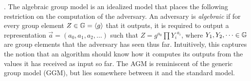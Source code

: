 . The algebraic group model is an idealized model that places the following restriction on the computation of the adversary. An adversary is \emph{algebraic} if for every group element $Z \in \mathbb{G} = \langle g \rangle$ that it outputs, it is required to output a representation $\vec{a} = (a_0, a_1, a_2, \dots)$ such that $Z = g^{a_0} \prod {Y_i}^{a_i}$, where $Y_1, Y_2, \dots \in \mathbb{G}$ are group elements that the adversary has seen thus far.
Intuitively, this captures the notion that an algorithm should know how it computes its outputs from the values it has received as input so far.
The AGM is reminiscent of the generic group model (GGM), but lies somewhere between it and the standard model.

\begin{figure}[t]
\begin{pchstack}[boxed,center,space=1em]
\begin{pchstack}
\end{pchstack}


\end{pchstack}
\end{figure}
